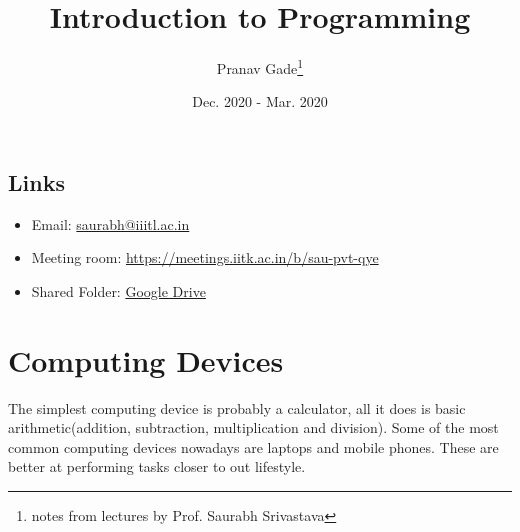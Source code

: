 \documentclass[10pt, a4paper]{report}
\author{Pranav Gade\thanks{notes from lectures by Prof. Saurabh Srivastava}}
\date{Dec. 2020 - Mar. 2020}
\title{Introduction to Programming}
\begin{document}
	\maketitle
	\tableofcontents
	\section*{Links}
	\begin{itemize}
		\item Email: \href{mailto:saurabh@iiitl.ac.in}{saurabh@iiitl.ac.in}
		\item Meeting room: \href{https://meetings.iitk.ac.in/b/sau-pvt-qye}{https://meetings.iitk.ac.in/b/sau-pvt-qye}
		\item Shared Folder: \href{https://drive.google.com/drive/folders/1SxSwW\_9C1nrGAwu12QV1FejA4IWp5ZIP?usp=sharing\_eip\&ts=5fcdaf02}{Google Drive}
	\end{itemize}
	\newpage
	
	\chapter{Computing Devices}
		The simplest computing device is probably a calculator, all it does is basic arithmetic(addition, subtraction, multiplication and division). Some of the most common computing devices nowadays are laptops and mobile phones. These are better at performing tasks closer to out lifestyle.
\end{document}
